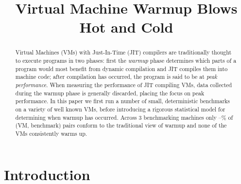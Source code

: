 \documentclass[preprint,numbers,10pt]{sigplanconf}
\begin{document}
\title{Virtual Machine Warmup Blows Hot and Cold}


\maketitle

%
%
%

\begin{abstract}
Virtual Machines (VMs) with Just-In-Time (JIT) compilers are traditionally thought
to execute programs in two phases: first the \emph{warmup} phase determines
which parts of a program would most benefit from dynamic compilation and JIT
compiles them into machine code; after
compilation has occurred, the program is said to be at \emph{peak performance}.
When measuring the performance of JIT compiling VMs, data collected
during the warmup phase is generally discarded, placing the focus on peak
performance. In this paper we first run a number of small,
deterministic benchmarks on a variety of well known VMs, before introducing
a rigorous statistical model for determining when warmup has occurred.
Across 3 benchmarking machines only \mintwo--\maxtwo\% of (VM, benchmark) pairs conform to
the traditional view of warmup and none of the
VMs consistently warms up.
\end{abstract}

\section{Introduction}
\label{sec:intro}
\end{document}
